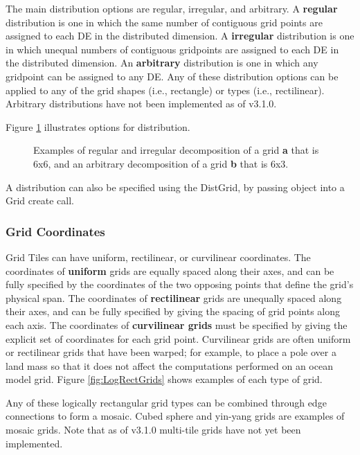 The main distribution options are regular, irregular, and arbitrary.
A {\bf regular} distribution is one in which the same number of
contiguous grid points are assigned to each DE in the
distributed dimension.  A {\bf irregular} distribution is one in which
unequal numbers of contiguous gridpoints are assigned to each
DE in the distributed dimension.  An {\bf arbitrary} distribution is
one in which any gridpoint can be assigned to any DE.  Any of these
distribution options can be applied to any of the grid shapes (i.e.,
rectangle) or types (i.e., rectilinear).  Arbitrary distributions
have not been implemented as of v3.1.0.

Figure \ref{fig:GridDecomps} illustrates options for distribution.
\begin{figure}
\caption{Examples of regular and irregular decomposition of
a grid {\bf a} that is 6x6, and an arbitrary decomposition of
a grid {\bf b} that is 6x3.}
\label{fig:GridDecomps}
\end{figure}

A distribution can also be specified using the DistGrid, by passing
object into a Grid create call.

\subsubsection{Grid Coordinates}
\label{sec:coordspec}
Grid Tiles can have uniform, rectilinear, or curvilinear
coordinates.  The coordinates of {\bf uniform} grids are equally spaced along
their axes, and can be fully specified by the coordinates of the two opposing points
that define the grid's physical span.  The coordinates of {\bf rectilinear} grids
are unequally spaced along their axes, and can be fully specified by giving
the spacing of grid points along each axis.  The coordinates of {\bf curvilinear 
grids} must be specified by giving the explicit set of coordinates for each
grid point.  Curvilinear grids are often uniform or rectilinear grids that 
have been warped; for example, to place a pole over a land mass so that it
does not affect the computations performed on an ocean model grid.  Figure
\ref{fig:LogRectGrids} shows examples of each type of grid.

Any of these logically rectangular grid types can be combined through edge
connections to form a mosaic.  Cubed sphere and yin-yang grids are examples
of mosaic grids.  Note that as of v3.1.0 multi-tile grids have not yet been
implemented.
 
